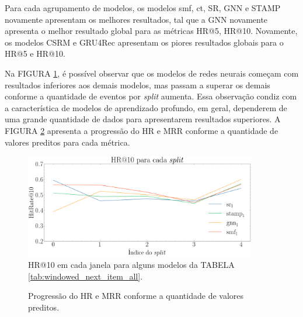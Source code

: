 Para cada agrupamento de modelos, os modelos smf, ct, SR, GNN e STAMP novamente
apresentam os melhores resultados, tal que a GNN novamente apresenta o melhor
resultado global para as métricas HR@5, HR@10. Novamente,
 os modelos CSRM e GRU4Rec apresentam os piores resultados globais para o
HR@5 e HR@10.

Na FIGURA
\ref{fig:next-item-single-123}, é possível observar que os modelos de redes neurais
começam com resultados inferiores aos demais modelos, mas passam a superar os
demais conforme a quantidade de eventos por \textit{split} aumenta. Essa
observação condiz com a característica de modelos de aprendizado profundo, em
geral, dependerem de uma grande quantidade de dados para apresentarem resultados
superiores. A FIGURA \ref{fig:progressao} apresenta a progressão do HR e MRR conforme a
quantidade de valores preditos para cada métrica.


\begin{figure}[htbp]
  \centering
  \includegraphics[width=0.9\textwidth]{chapters/chap04/images/hr10_splits.png}
  \caption{HR@10 em cada janela para alguns modelos da TABELA
  \ref{tab:windowed_next_item_all}.}
  \label{fig:next-item-single-123}
\end{figure}


\begin{figure}[htbp]
  \hfill
  \hfill
  \hfill
  \caption{Progressão do HR e MRR conforme a quantidade de valores preditos.}
  \label{fig:progressao}
  \end{figure}


